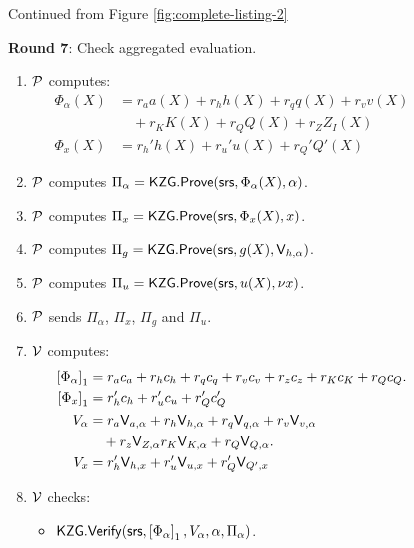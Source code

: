 \begin{figure}[t!]
    \begin{mdframed}
        \begin{center}
            Continued from Figure \ref{fig:complete-listing-2}
        \end{center}
        \item {\bf Round 7}: Check aggregated evaluation.
        \begin{enumerate}[leftmargin=1em, label=\arabic*.]
            \item $\prover$ computes:
            \begin{align*}
                \Phi_\alpha(X) &= r_a a(X)+ r_h h(X) + r_q q(X) + r_v v(X) \\
                &\quad + r_K K(X) + r_Q Q(X) + r_Z Z_I(X) \\
                \Phi_x(X) &= r_h' h(X) + r_u' u(X)+r_Q'Q'(X)
            \end{align*}
            \item $\prover$ computes $\Pi_\alpha = \KZGopen(\srs, \Phi_\alpha(X), \alpha)$.
            \item $\prover$ computes $\Pi_x = \KZGopen(\srs, \Phi_x(X), x)$.
            \item $\prover$ computes $\Pi_g = \KZGopen(\srs, g(X), \val{\alpha}{h})$.
            \item $\prover$ computes $\Pi_u = \KZGopen(\srs, u(X), \nu x)$.
            \item $\prover$ sends $\Pi_\alpha$, $\Pi_x$, $\Pi_g$ and $\Pi_u$.
            \item $\verifier$ computes:
            \begin{align*}
                \gone{\Phi_\alpha} &= r_a c_a + r_h c_h + r_q c_q + r_v c_v + r_z c_z + r_K c_K + r_Q c_Q. \\
                \gone{\Phi_x} &= r_h' c_h + r_u' c_u + r_Q' c_Q' \\
                V_{\alpha} &= r_a \val{\alpha}{a} + r_h \val{\alpha}{h} + r_q \val{\alpha}{q} + r_v \val{\alpha}{v} \\
                &\quad + r_z\val{\alpha}{Z} r_K \val{\alpha}{K} + r_Q \val{\alpha}{Q}. \\
                V_x &= r_h' \val{x}{h} + r_u' \val{x}{u}+r_Q' \val{x}{Q'}
            \end{align*}
            \item $\verifier$ checks:
            \begin{itemize}[leftmargin=1em]
                \item $\KZGverify(\srs, \gone{\Phi_\alpha}, V_\alpha, \alpha, \Pi_\alpha)$.

\end{itemize}
\end{enumerate}
\end{mdframed}
\end{figure}
